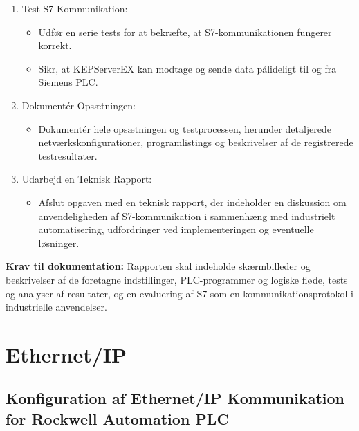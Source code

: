 \begin{enumerate}
\begin{itemize}
	\end{itemize}
	\item Test S7 Kommunikation:
	\begin{itemize}
		\item Udfør en serie tests for at bekræfte, at S7-kommunikationen fungerer korrekt.
		\item Sikr, at KEPServerEX kan modtage og sende data pålideligt til og fra Siemens PLC.
	\end{itemize}
	\item Dokumentér Opsætningen:
	\begin{itemize}
		\item Dokumentér hele opsætningen og testprocessen, herunder detaljerede netværkskonfigurationer, programlistings og beskrivelser af de registrerede testresultater.
	\end{itemize}
	\item Udarbejd en Teknisk Rapport:
	\begin{itemize}
		\item Afslut opgaven med en teknisk rapport, der indeholder en diskussion om anvendeligheden af S7-kommunikation i sammenhæng med industrielt automatisering, udfordringer ved implementeringen og eventuelle løsninger.
	\end{itemize}
\end{enumerate}
\textbf{Krav til dokumentation:} Rapporten skal indeholde skærmbilleder og beskrivelser af de foretagne indstillinger, PLC-programmer og logiske fløde, tests og analyser af resultater, og en evaluering af S7 som en kommunikationsprotokol i industrielle anvendelser.

\section{Ethernet/IP}
\subsection*{Konfiguration af Ethernet/IP Kommunikation for Rockwell Automation PLC}
\label{subsec:ethernet_ip_comm_rockwell}

